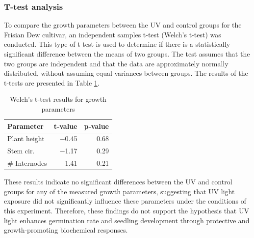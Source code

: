 \subsubsection{T-test analysis}

To compare the growth parameters between the UV and control groups for the Frisian Dew cultivar, an independent samples t-test (Welch's t-test) was conducted. This type of t-test is used to determine if there is a statistically significant difference between the means of two groups. The test assumes that the two groups are independent and that the data are approximately normally distributed, without assuming equal variances between groups. The results of the t-tests are presented in Table \ref{tab:t-test_results}.

\begin{table}[H]
    \caption{Welch's t-test results for growth parameters}
    \label{tab:t-test_results}
    \begin{tabular}{lrr}
        \toprule
        Parameter & t-value & p-value \\
        \midrule
        Plant height & \num[mode=text]{-0.45} & \num[mode=text]{0.68} \\
        Stem cir. & \num[mode=text]{-1.17} & \num[mode=text]{0.29} \\
        \# Internodes & \num[mode=text]{-1.41} & \num[mode=text]{0.21} \\
        \bottomrule
    \end{tabular}
\end{table}

These results indicate no significant differences between the UV and control groups for any of the measured growth parameters, suggesting that UV light exposure did not significantly influence these parameters under the conditions of this experiment. Therefore, these findings do not support the hypothesis that UV light enhances germination rate and seedling development through protective and growth-promoting biochemical responses.
